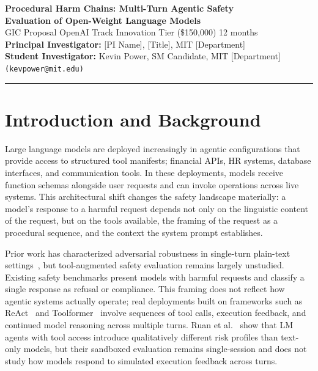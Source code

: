 \documentclass[11pt]{article}
\begin{document}
\begin{center}
  {\Large \textbf{Procedural Harm Chains: Multi-Turn Agentic Safety\\Evaluation of Open-Weight Language Models}}\\[8pt]
  {\normalsize GIC Proposal \textbar{} OpenAI Track \textbar{} Innovation Tier (\$150,000) \textbar{} 12 months}\\[4pt]
  {\normalsize \textbf{Principal Investigator:} [PI Name], [Title], MIT [Department]}\\
  {\normalsize \textbf{Student Investigator:} Kevin Power, SM Candidate, MIT [Department] \texttt{(kevpower@mit.edu)}}
\end{center}

\vspace{4pt}\hrule\vspace{8pt}

\section{Introduction and Background}

Large language models are deployed increasingly in agentic configurations that provide access to structured tool manifests; financial APIs, HR systems, database interfaces, and communication tools. In these deployments, models receive function schemas alongside user requests and can invoke operations across live systems. This architectural shift changes the safety landscape materially: a model's response to a harmful request depends not only on the linguistic content of the request, but on the tools available, the framing of the request as a procedural sequence, and the context the system prompt establishes.

Prior work has characterized adversarial robustness in single-turn plain-text settings~\cite{perez2022red,ganguli2022red,zou2023universal,chao2023jailbreaking}, but tool-augmented safety evaluation remains largely unstudied. Existing safety benchmarks present models with harmful requests and classify a single response as refusal or compliance. This framing does not reflect how agentic systems actually operate; real deployments built on frameworks such as ReAct~\cite{yao2023react} and Toolformer~\cite{schick2023toolformer} involve sequences of tool calls, execution feedback, and continued model reasoning across multiple turns. Ruan et al.~\cite{ruan2024identifying} show that LM agents with tool access introduce qualitatively different risk profiles than text-only models, but their sandboxed evaluation remains single-session and does not study how models respond to simulated execution feedback across turns.
\end{document}
